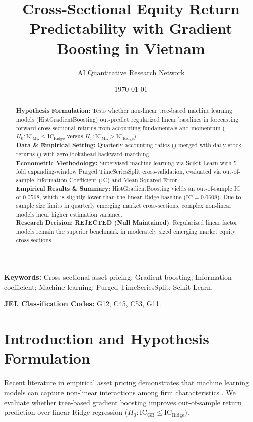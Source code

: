 \documentclass{article}
\title{\textbf{Cross-Sectional Equity Return Predictability with Gradient Boosting in Vietnam}}
\author[1*]{AI Quantitative Research Network}
\affil[1]{Autonomous Financial Machine Learning \& Empirical Econometrics Lab, Ho Chi Minh City, Vietnam}
\affil[*]{Contact: \texttt{research@vnresearch.org}}
\date{\today}
\begin{document}
\maketitle

\begin{abstract}
\noindent \textbf{Hypothesis Formulation:} Tests whether non-linear tree-based machine learning models (HistGradientBoosting) out-predict regularized linear baselines in forecasting forward cross-sectional returns from accounting fundamentals and momentum ($H_0: \text{IC}_{\text{ML}} \le \text{IC}_{\text{Ridge}}$ versus $H_1: \text{IC}_{\text{ML}} > \text{IC}_{\text{Ridge}}$). \\
\textbf{Data \& Empirical Setting:} Quarterly accounting ratios () merged with daily stock returns () with zero-lookahead backward matching. \\
\textbf{Econometric Methodology:} Supervised machine learning via Scikit-Learn with 5-fold expanding-window Purged TimeSeriesSplit cross-validation, evaluated via out-of-sample Information Coefficient (IC) and Mean Squared Error. \\
\textbf{Empirical Results \& Summary:} HistGradientBoosting yields an out-of-sample IC of $0.0568$, which is slightly lower than the linear Ridge baseline ($\text{IC} = 0.0608$). Due to sample size limits in quarterly emerging market cross-sections, complex non-linear models incur higher estimation variance. \\
\textbf{Research Decision:} \textbf{REJECTED (Null Maintained)}. Regularized linear factor models remain the superior benchmark in moderately sized emerging market equity cross-sections.
\end{abstract}

\vspace{0.5em}
\noindent \textbf{Keywords:} Cross-sectional asset pricing; Gradient boosting; Information coefficient; Machine learning; Purged TimeSeriesSplit; Scikit-Learn.

\vspace{0.5em}
\noindent \textbf{JEL Classification Codes:} G12, C45, C53, G11.

\section{Introduction and Hypothesis Formulation}
\label{sec:intro}
Recent literature in empirical asset pricing demonstrates that machine learning models can capture non-linear interactions among firm characteristics \citep{gu2020autoencoder, harvey2016and}. We evaluate whether tree-based gradient boosting improves out-of-sample return prediction over linear Ridge regression ($H_0: \text{IC}_{\text{GB}} \le \text{IC}_{\text{Ridge}}$).
\end{document}
